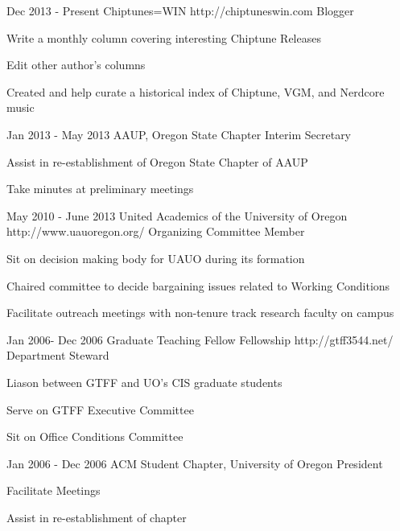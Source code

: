 \documentclass[10pt]{article} %
\begin{document}
\job
{Dec 2013 - }{Present}
{Chiptunes=WIN}
{http://chiptuneswin.com}
{Blogger}
{

\begin{itemize-noindent}
\item{Write a monthly column covering interesting Chiptune Releases}
\item{Edit other author's columns}
\item{Created and help curate a historical index of Chiptune, VGM, and Nerdcore music}
\end{itemize-noindent}

}

\job
{Jan 2013 - }{May 2013}
{AAUP, Oregon State Chapter}
{}
{Interim Secretary}
{

\begin{itemize-noindent}
\item{Assist in re-establishment of Oregon State Chapter of AAUP}
\item{Take minutes at preliminary meetings}
\end{itemize-noindent}

}

\job
{May 2010 - }{June 2013}
{United Academics of the University of Oregon}
{http://www.uauoregon.org/}
{Organizing Committee Member}
{
\begin{itemize-noindent}
\item{Sit on decision making body for UAUO during its formation}
\item{Chaired committee to decide bargaining issues related to Working Conditions}
\item{Facilitate outreach meetings with non-tenure track research faculty on campus}
\end{itemize-noindent}
}

\job
{Jan 2006- }{Dec 2006}
{Graduate Teaching Fellow Fellowship}
{http://gtff3544.net/}
{Department Steward}
{
\begin{itemize-noindent}
\item{Liason between GTFF and UO's CIS graduate students}
\item{Serve on GTFF Executive Committee}
\item{Sit on Office Conditions Committee}
\end{itemize-noindent}
}

\job
{Jan 2006 - }{Dec 2006}
{ACM Student Chapter, University of Oregon}
{}
{President}
{
\begin{itemize-noindent}
\item{Facilitate Meetings}
\item{Assist in re-establishment of chapter}
\end{itemize-noindent}
}
\end{document}

